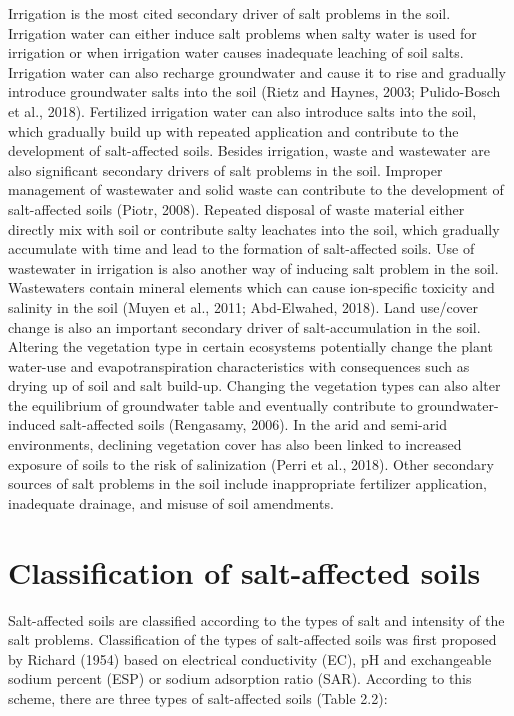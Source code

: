 \documentclass[
  10pt,
  b5paper,
]{book}
\begin{document}
Irrigation is the most cited secondary driver of salt problems in the soil. Irrigation water can either induce salt problems when salty water is used for irrigation or when irrigation water causes inadequate leaching of soil salts. Irrigation water can also recharge groundwater and cause it to rise and gradually introduce groundwater salts into the soil (Rietz and Haynes, 2003; Pulido-Bosch et al., 2018). Fertilized irrigation water can also introduce salts into the soil, which gradually build up with repeated application and contribute to the development of salt-affected soils.
Besides irrigation, waste and wastewater are also significant secondary drivers of salt problems in the soil. Improper management of wastewater and solid waste can contribute to the development of salt-affected soils (Piotr, 2008). Repeated disposal of waste material either directly mix with soil or contribute salty leachates into the soil, which gradually accumulate with time and lead to the formation of salt-affected soils. Use of wastewater in irrigation is also another way of inducing salt problem in the soil. Wastewaters contain mineral elements which can cause ion-specific toxicity and salinity in the soil (Muyen et al., 2011; Abd-Elwahed, 2018).
Land use/cover change is also an important secondary driver of salt-accumulation in the soil. Altering the vegetation type in certain ecosystems potentially change the plant water-use and evapotranspiration characteristics with consequences such as drying up of soil and salt build-up. Changing the vegetation types can also alter the equilibrium of groundwater table and eventually contribute to groundwater-induced salt-affected soils (Rengasamy, 2006). In the arid and semi-arid environments, declining vegetation cover has also been linked to increased exposure of soils to the risk of salinization (Perri et al., 2018).
Other secondary sources of salt problems in the soil include inappropriate fertilizer application, inadequate drainage, and misuse of soil amendments.

\hypertarget{classification-of-salt-affected-soils}{%
\section{Classification of salt-affected soils}\label{classification-of-salt-affected-soils}}

Salt-affected soils are classified according to the types of salt and intensity of the salt problems. Classification of the types of salt-affected soils was first proposed by Richard (1954) based on electrical conductivity (EC), pH and exchangeable sodium percent (ESP) or sodium adsorption ratio (SAR). According to this scheme, there are three types of salt-affected soils (Table 2.2):
\end{document}
